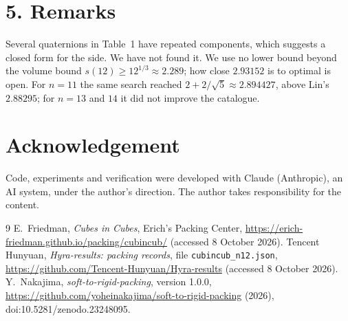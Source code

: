 \documentclass[11pt]{article}
\begin{document}
\section*{5. Remarks}
Several quaternions in Table~1 have repeated components, which suggests a closed form for the side. We have not found it. We use no lower bound beyond the volume bound $s(12)\ge 12^{1/3}\approx2.289$; how close $2.93152$ is to optimal is open. For $n=11$ the same search reached $2+2/\sqrt5\approx2.894427$, above Lin's $2.88295$; for $n=13$ and $14$ it did not improve the catalogue.

\section*{Acknowledgement}
Code, experiments and verification were developed with Claude (Anthropic), an AI system, under the author's direction. The author takes responsibility for the content.

\begin{thebibliography}{9}\small
{} E.~Friedman, \emph{Cubes in Cubes}, Erich's Packing Center, \url{https://erich-friedman.github.io/packing/cubincub/} (accessed 8 October 2026).
 Tencent Hunyuan, \emph{Hyra-results: packing records}, file \texttt{cubincub\_n12.json}, \url{https://github.com/Tencent-Hunyuan/Hyra-results} (accessed 8 October 2026).
 Y.~Nakajima, \emph{soft-to-rigid-packing}, version 1.0.0, \url{https://github.com/yoheinakajima/soft-to-rigid-packing} (2026), doi:10.5281/zenodo.23248095.
\end{thebibliography}
\end{document}
